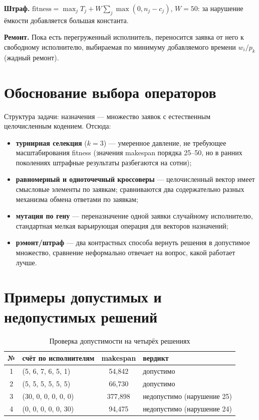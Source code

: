 \documentclass[12pt,a4paper]{article}
\begin{document}
\textbf{Штраф.} $\text{fitness} = \max_j T_j + W \sum_j \max(0, n_j - c_j)$,
$W = 50$: за нарушение ёмкости добавляется большая константа.

\textbf{Ремонт.} Пока есть перегруженный исполнитель, переносится заявка от
него к свободному исполнителю, выбираемая по минимуму добавляемого времени
$w_i / p_k$ (жадный ремонт).

\section{Обоснование выбора операторов}

Структура задачи: назначения --- множество заявок с естественным
целочисленным кодением. Отсюда:
\begin{itemize}
\item \textbf{турнирная селекция} ($k = 3$) --- умеренное давление, не
  требующее масштабирования fitness (значения makespan порядка 25--50,
  но в ранних поколениях штрафные результаты разбегаются на сотни);
\item \textbf{равномерный и одноточечный кроссоверы} --- целочисленный
  вектор имеет смысловые элементы по заявкам; сравниваются два
  содержательно разных механизма обмена ответами по заявкам;
\item \textbf{мутация по гену} --- переназначение одной заявки случайному
  исполнителю, стандартная мелкая варьирующая операция для векторов
  назначений;
\item \textbf{рэмонт/штраф} --- два контрастных способа вернуть решения в
  допустимое множество, сравнение неформально отвечает на вопрос, какой
  работает лучше.
\end{itemize}

\section{Примеры допустимых и недопустимых решений}

\begin{table}[H]
\centering
\small
\caption{Проверка допустимости на четырёх решениях}
\label{tab:examples}
\begin{tabular}{clcl}
\toprule
№ & счёт по исполнителям & makespan & вердикт \\
\midrule
1 & (5, 6, 7, 6, 5, 1) & 54{,}842 & допустимо \\
2 & (5, 5, 5, 5, 5, 5) & 66{,}730 & допустимо \\
3 & (30, 0, 0, 0, 0, 0) & 377{,}898 & недопустимо (нарушение 25) \\
4 & (0, 0, 0, 0, 0, 30) & 94{,}475 & недопустимо (нарушение 24) \\
\bottomrule
\end{tabular}
\end{table}
\end{document}
